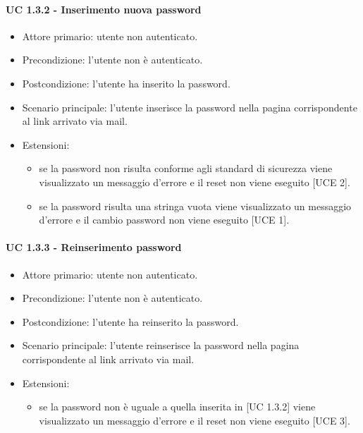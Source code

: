         \paragraph{UC 1.3.2 - Inserimento nuova password}
            \begin{itemize}
                \item Attore primario: utente non autenticato.
                \item Precondizione: l'utente non è autenticato.
                \item Postcondizione: l'utente ha inserito la password.
                \item Scenario principale: l'utente inserisce la password nella pagina corrispondente al link arrivato via mail.
                \item Estensioni:
                    \begin{itemize}
                        \item se la password non risulta conforme agli standard di sicurezza viene visualizzato un messaggio d'errore e il reset non viene eseguito [UCE 2].
                        \item se la password risulta una stringa vuota viene visualizzato un messaggio d'errore e il cambio password non viene eseguito [UCE 1].
                    \end{itemize}
            \end{itemize}
        \paragraph{UC 1.3.3 - Reinserimento password}
            \begin{itemize}
                \item Attore primario: utente non autenticato.
                \item Precondizione: l'utente non è autenticato.
                \item Postcondizione: l'utente ha reinserito la password.
                \item Scenario principale: l'utente reinserisce la password nella pagina corrispondente al link arrivato via mail.
                \item Estensioni:
                    \begin{itemize}
                        \item se la password non è uguale a quella inserita in [UC 1.3.2] viene visualizzato un messaggio d'errore e il reset non viene eseguito [UCE 3].
                    \end{itemize}
            \end{itemize}
